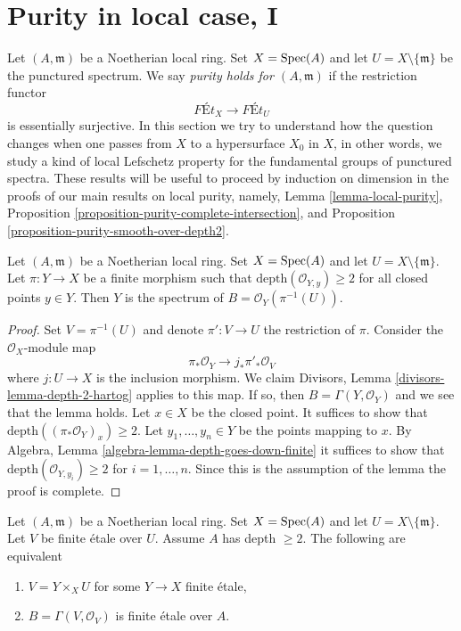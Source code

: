 \section{Purity in local case, I}
\label{section-local-purity}

\noindent
Let $(A, \mathfrak m)$ be a Noetherian local ring. Set $X = \mathop{\mathrm{Spec}}(A)$
and let $U = X \setminus \{\mathfrak m\}$ be the punctured spectrum.
We say {\it purity holds for $(A, \mathfrak m)$} if the restriction functor
$$
\textit{F\'Et}_X \longrightarrow \textit{F\'Et}_U
$$
is essentially surjective. In this section we try to understand how the
question changes when one passes from $X$ to a hypersurface $X_0$ in $X$,
in other words, we study a kind of local Lefschetz property for the
fundamental groups of punctured spectra.
These results will be useful to proceed by induction on dimension
in the proofs of our main results on local purity, namely,
Lemma \ref{lemma-local-purity},
Proposition \ref{proposition-purity-complete-intersection}, and
Proposition \ref{proposition-purity-smooth-over-depth2}.

\begin{lemma}
\label{lemma-sections-over-punctured-spec}
Let $(A, \mathfrak m)$ be a Noetherian local ring. Set $X = \mathop{\mathrm{Spec}}(A)$
and let $U = X \setminus \{\mathfrak m\}$.
Let $\pi : Y \to X$ be a finite morphism such that
$\text{depth}(\mathcal{O}_{Y, y}) \geq 2$ for all closed points
$y \in Y$.
Then $Y$ is the spectrum of $B = \mathcal{O}_Y(\pi^{-1}(U))$.
\end{lemma}

\begin{proof}
Set $V = \pi^{-1}(U)$ and denote $\pi' : V \to U$ the restriction of $\pi$.
Consider the $\mathcal{O}_X$-module map
$$
\pi_*\mathcal{O}_Y \longrightarrow j_*\pi'_*\mathcal{O}_V
$$
where $j : U \to X$ is the inclusion morphism. We claim
Divisors, Lemma \ref{divisors-lemma-depth-2-hartog}
applies to this map. If so, then $B = \Gamma(Y, \mathcal{O}_Y)$
and we see that the lemma holds. Let $x \in X$ be the closed point.
It suffices to show that
$\text{depth}((\pi_*\mathcal{O}_Y)_x) \geq 2$.
Let $y_1, \ldots, y_n \in Y$ be the points mapping to $x$.
By Algebra, Lemma \ref{algebra-lemma-depth-goes-down-finite}
it suffices to show that
$\text{depth}(\mathcal{O}_{Y, y_i}) \geq 2$ for $i = 1, \ldots, n$.
Since this is the assumption of the lemma the proof is complete.
\end{proof}

\begin{lemma}
\label{lemma-reformulate-purity}
Let $(A, \mathfrak m)$ be a Noetherian local ring. Set $X = \mathop{\mathrm{Spec}}(A)$
and let $U = X \setminus \{\mathfrak m\}$.
Let $V$ be finite \'etale
over $U$. Assume $A$ has depth $\geq 2$. The following are equivalent
\begin{enumerate}
\item $V = Y \times_X U$ for some $Y \to X$ finite \'etale,
\item $B = \Gamma(V, \mathcal{O}_V)$ is finite \'etale over $A$.
\end{enumerate}
\end{lemma}

